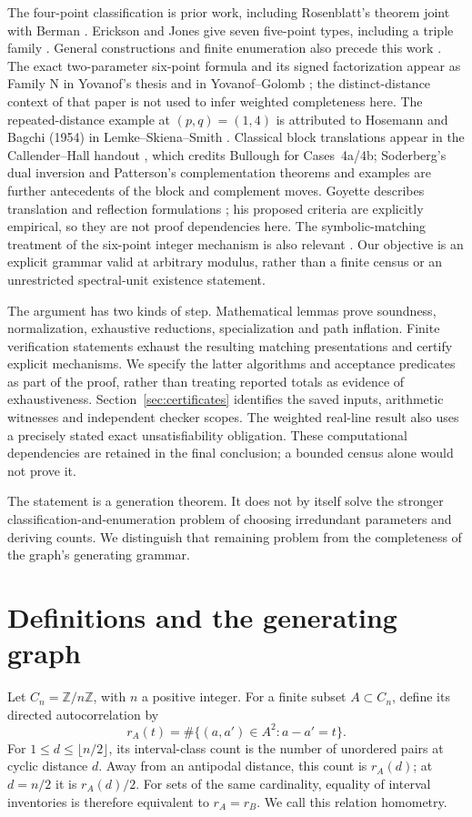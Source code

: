\documentclass[11pt]{article}
\theoremstyle{remark}
\newcommand{\Z}{\mathbb Z}
\newcommand{\Zn}{\Z/n\Z}
\begin{document}
The four-point classification is prior work, including Rosenblatt's theorem
joint with Berman \cite[Theorem 3.9]{rosenblatt}. Erickson and Jones give
seven five-point types, including a triple family \cite{ej}.
General constructions and finite enumeration also precede this work
\cite{jj,mandereau}. The exact two-parameter six-point formula and its
signed factorization appear as Family N in Yovanof's thesis
\cite[p.~156]{yovanof} and in Yovanof--Golomb \cite[p.~47]{yg}; the distinct-distance context of that paper is not used
to infer weighted completeness here. The repeated-distance example at
$(p,q)=(1,4)$ is attributed to Hosemann and Bagchi (1954) in
Lemke--Skiena--Smith \cite[Table~1]{lss}. Classical block translations
appear in the Callender--Hall handout \cite[Cases~3--4]{ch}, which credits
Bullough \cite{bullough1} for Cases~4a/4b; Soderberg's dual inversion
\cite{soderberg} and Patterson's complementation theorems and examples
\cite{patterson} are further antecedents of the block and complement moves. Goyette describes translation and reflection
formulations \cite[Formulas~3.2 and~3.5]{goyette}; his proposed criteria
are explicitly empirical, so they are not proof dependencies here.
The symbolic-matching treatment of the six-point integer mechanism is also
relevant \cite{pg}. Our objective is an explicit grammar
valid at arbitrary modulus, rather than a finite census or an unrestricted
spectral-unit existence statement.

The argument has two kinds of step. Mathematical lemmas prove soundness,
normalization, exhaustive reductions, specialization and path inflation.
Finite verification statements exhaust the resulting matching presentations
and certify explicit mechanisms. We specify the latter algorithms and
acceptance predicates as part of the proof, rather than treating reported
totals as evidence of exhaustiveness. Section~\ref{sec:certificates} identifies
the saved inputs, arithmetic witnesses and independent checker scopes.
The weighted real-line result also uses a precisely stated exact
unsatisfiability obligation. These computational dependencies are retained
in the final conclusion; a bounded census alone would not prove it.

The statement is a generation theorem. It does not by itself solve the
stronger classification-and-enumeration problem of choosing irredundant
parameters and deriving counts. We distinguish that remaining problem from
the completeness of the graph's generating grammar.

\section{Definitions and the generating graph}
Let $C_n=\Zn$, with $n$ a positive integer. For a finite subset $A\subset C_n$,
define its directed autocorrelation by
\[
 r_A(t)=\#\{(a,a')\in A^2:a-a'=t\}.
\]
For $1\le d\le\lfloor n/2\rfloor$, its interval-class count is the number
of unordered pairs at cyclic distance $d$. Away from an antipodal distance,
this count is $r_A(d)$; at $d=n/2$ it is $r_A(d)/2$.
For sets of the same cardinality, equality of interval inventories is
therefore equivalent to $r_A=r_B$. We call this relation homometry.
\end{document}
